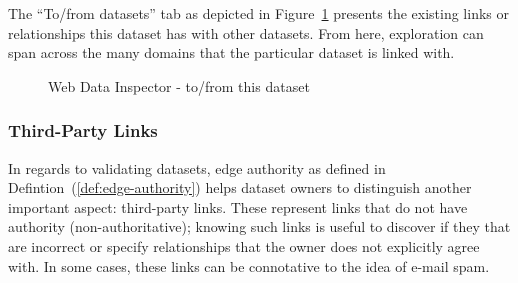 The ``To/from datasets'' tab as depicted in Figure~\ref{fig:wdi:toFromThisDataset} presents the existing links or relationships this dataset has with other datasets. From here, exploration can span across the many domains that the particular dataset is linked with.

\begin{figure}
	\centering
	\caption{Web Data Inspector - to/from this dataset}
	\label{fig:wdi:toFromThisDataset}
\end{figure}

\subsubsection{Third-Party Links}

In regards to validating datasets, edge authority as defined in Defintion~(\ref{def:edge-authority}) helps dataset owners to distinguish another important aspect: third-party links. These represent links that do not have authority (non-authoritative); knowing such links is useful to discover if they that are incorrect or specify relationships that the owner does not explicitly agree with. In some cases, these links can be connotative to the idea of e-mail spam.

